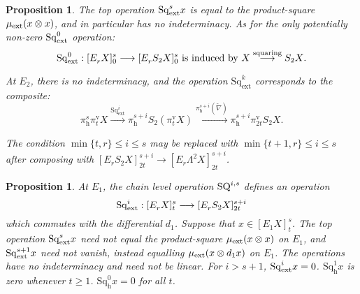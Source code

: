 \documentclass[11pt]{amsart} \renewcommand{\baselinestretch}{1.2}
\theoremstyle{plain}
\newtheorem{prop}[thm]{Proposition}
\numberwithin{equation}{section} %
\theoremstyle{plain}
\newtheorem{prop}[thm]{Proposition}
\numberwithin{equation}{chapter} %
\renewcommand{\to}{\longrightarrow}
\newcommand{\ExtCohOp}{\mathrm{Sq}_\mathrm{ext}}
\newcommand{\Sq}{\mathrm{Sq}}
\newcommand{\Edownup}[5]{[E_{#1}^{#2}#3]^{#4}_{#5}}
\newcommand{\uver}{^\mathrm{v}}
\newcommand{\dhor}{_\mathrm{h}}
\newcommand{\Sqh}{\mathrm{Sq}\dhor}
\begin{document}
\begin{second quadrant homotopy sseq operations}
\begin{prop}
The \emph{top} operation $\Sq^s_\textup{ext}x$ is equal to the product-square $\mu_\textup{ext}(x\otimes x)$, and in particular has no indeterminacy. 
As for the only potentially non-zero $\Sq^0_\textup{ext}$ operation:
\[\Sq^0_\textup{ext}:\Edownup{r}{}{X}{s}{0}\to \Edownup{r}{}{S_2X}{s}{0}\text{ is induced by $X\overset{\textup{squaring}}{\to}S_2X$}.\]

At $E_2$, there is no indeterminacy, and the operation $\ExtCohOp^k$ corresponds to the composite:
\[\pi\dhor^s\pi\uver_t X
\overset{\ExtCohOp^i}{\to} 
\pi\dhor^{s+i}S_2(\pi\uver_t X)
\overset{\pi\dhor^{s+i}(\widetilde{\nabla})}{\to}
\pi\dhor^{s+i}\pi\uver_{2t}S_2 X.
\]

The condition $\min\{t,r\}\leq i\leq s$ may be replaced with $\min\{t+1,r\}\leq i\leq s$ after composing with $\Edownup{r}{}{S_2X}{s+i}{2t}\to \Edownup{r}{}{\Lambda^2X}{s+i}{2t}$.
\end{prop}

\begin{prop}
\label{prop on e1 steens 2}
At $E_1$, 
the chain level operation $\textup{SQ}^{i,s}$ defines an operation
\[\Sq^i_\textup{ext}:\Edownup{r}{}{X}{s}{t}\to \Edownup{r}{}{S_2X}{s+i}{2t}\]
which commutes with the differential $d_{1}$. Suppose that $x\in \Edownup{1}{}{X}{s}{t}$.
The top operation $\Sq^s_\textup{ext}x$ need not equal the product-square $\mu_\textup{ext}(x\otimes x)$ on $E_1$, and
$\Sq^{s+1}_\textup{ext}x$ need not vanish, instead equalling $\mu_\textup{ext}(x\otimes d_1x)$ on $E_1$.
The operations have no indeterminacy and need not be linear. For $i>s+1$, $\Sq^i_\textup{ext}x=0$. $\Sqh^1x$ is zero whenever $t\geq1$. $\Sqh^0x=0$ for all $t$.
\end{prop}



\end{second quadrant homotopy sseq operations}
\end{document}
